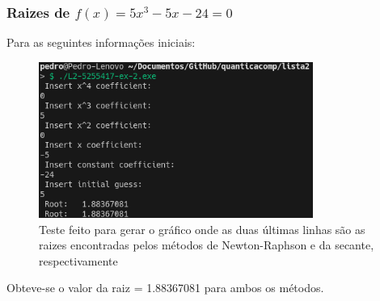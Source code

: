\documentclass[12pt, a4paper]{article} %
\begin{document}
        \subsubsection{Raizes de $f(x) = 5x^3 - 5x - 24 = 0$}
            
            Para as seguintes informa\c{c}\~oes iniciais:
            \begin{figure}[H]
                \centering
                \includegraphics[width=0.8\textwidth]{../images/results-ex-2.2-5.png}
                \caption{Teste feito para gerar o gr\'afico onde as duas \'ultimas linhas s\~ao as raizes encontradas pelos m\'etodos de Newton-Raphson e da secante, respectivamente}
            \end{figure}
            Obteve-se o valor da raiz = 1.88367081 para ambos os m\'etodos.
\end{document}
